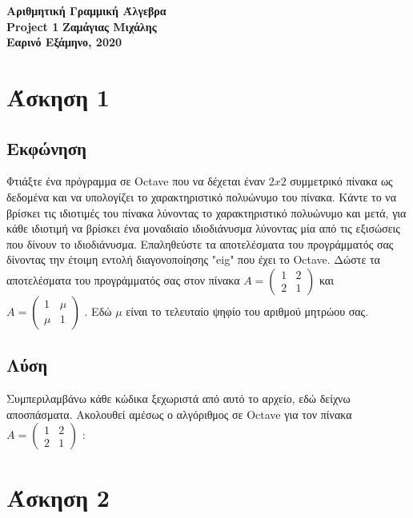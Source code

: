 \documentclass[a4paper,12pt]{article}
\begin{document}
\begin{titlepage}
    \begin{center}
        \vspace*{\fill}
        \huge{\textbf{Αριθμητική Γραμμική Άλγεβρα\\}}
        \vfill
        \huge{\textbf{Project 1}}
        \vspace*{\fill}
        \vfill
        \normalsize\textbf{Ζαμάγιας Μιχάλης\\}
        \small\textbf{Εαρινό Εξάμηνο, 2020\\}
        \vfill
    \end{center}
\end{titlepage}
\tableofcontents
\newpage\section{Άσκηση 1}
\subsection{Εκφώνηση}
Φτιάξτε ένα πρόγραμμα σε Octave που να δέχεται έναν ${2x2}$ συμμετρικό πίνακα ως δεδομένα και να
υπολογίζει το χαρακτηριστικό πολυώνυμο του πίνακα. Κάντε το να βρίσκει τις ιδιοτιμές του πίνακα
λύνοντας το χαρακτηριστικό πολυώνυμο και μετά, για κάθε ιδιοτιμή να βρίσκει ένα μοναδιαίο ιδιοδιάνυσμα
λύνοντας μία από τις εξισώσεις που δίνουν το ιδιοδιάνυσμα. Επαληθεύστε τα αποτελέσματα του προγράμματός
σας δίνοντας την έτοιμη εντολή διαγονοποίησης "eig" που έχει το Octave. Δώστε τα αποτελέσματα του
προγράμματός σας στον πίνακα
$
    A=\begin{pmatrix}
        1 & 2 \\
        2 & 1
    \end{pmatrix}
$
και
$
    A=\begin{pmatrix}
        1   & \mu \\
        \mu & 1
    \end{pmatrix}
$
. Εδώ ${\mu}$ είναι το τελευταίο ψηφίο του αριθμού μητρώου σας.
\subsection{Λύση}
Συμπεριλαμβάνω κάθε κώδικα ξεχωριστά από αυτό το αρχείο, εδώ δείχνω αποσπάσματα.
Ακολουθεί αμέσως ο αλγόριθμος σε Octave για τον πίνακα
$
    A=\begin{pmatrix}
        1 & 2 \\
        2 & 1
    \end{pmatrix}
$
:
\newpage\section{Άσκηση 2}
\end{document}
